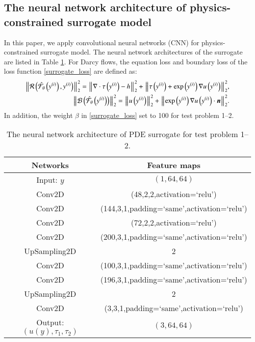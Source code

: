\documentclass[review,12pt]{elsarticle}
\renewcommand{\mathbf}{\boldsymbol}
\begin{document}
\begin{appendix}
\section{The neural network architecture of physics-constrained surrogate model}\label{surrogate_nn}
In this paper, we apply convolutional neural networks (CNN) for physics-constrained surrogate model. The neural network architectures of the surrogate are listed in Table \ref{surrogate_archi_table}. For Darcy flows, the equation loss and boundary loss of the loss function \eqref{surrogate_loss} are defined as:
\begin{align}
    {\left\Arrowvert \mathcal{R}\left(\hat{\mathcal{F}}_{\theta}\left(y^{(i)}\right),y^{(i)}\right)\right\Arrowvert}_2^2={\left\Arrowvert \nabla \cdot\tau\left(y^{(i)}\right)-h\right\Arrowvert}_2^2 +  {\left\Arrowvert\tau\left(y^{(i)}\right)+\exp\left(y^{(i)}\right)\nabla u\left(y^{(i)}\right)\right\Arrowvert}_2^2,\\
    {\left\Arrowvert\mathcal{B}\left(\hat{\mathcal{F}}_{\theta}\left(y^{(i)}\right)\right)\right\Arrowvert}_2^2 =  {\left\Arrowvert u\left(y^{(i)}\right)\right\Arrowvert}_2^2 +  {\left\Arrowvert \exp\left(y^{(i)}\right)\nabla u\left(y^{(i)}\right)\cdot \mathbf{n}\right\Arrowvert}_2^2.    
\end{align}
In addition, the weight $\beta$ in  \eqref{surrogate_loss} set to 100 for test problem 1--2.
\begin{table}[H]
    \centering
    \caption{The neural network architecture of PDE surrogate for test problem 1--2.}
     \label{surrogate_archi_table}
    \begin{tabular}{|c|c|}
    \hline
        Networks& Feature maps  \\
    \hline 
    Input: $y$ &$(1,64,64)$\\
    \hline
    Conv2D&(48,2,2,activation=`relu')\\
    \hline 
    Conv2D&(144,3,1,padding=`same',activation=`relu')\\
    \hline 
    Conv2D&(72,2,2,activation=`relu')\\
    \hline 
    Conv2D&(200,3,1,padding=`same',activation=`relu')\\
    \hline 
    UpSampling2D&2\\
    \hline 
    Conv2D&(100,3,1,padding=`same',activation=`relu')\\
    \hline 
    Conv2D&(196,3,1,padding=`same',activation=`relu')\\
    \hline 
    UpSampling2D&2\\
    \hline 
    Conv2D&(3,3,1,padding=`same',activation=`relu')\\
    \hline
    Output: $(u(y),\tau_1,\tau_2)$ &$(3,64,64)$   \\ \hline
    \end{tabular}
\end{table}


\end{appendix}
\end{document}
